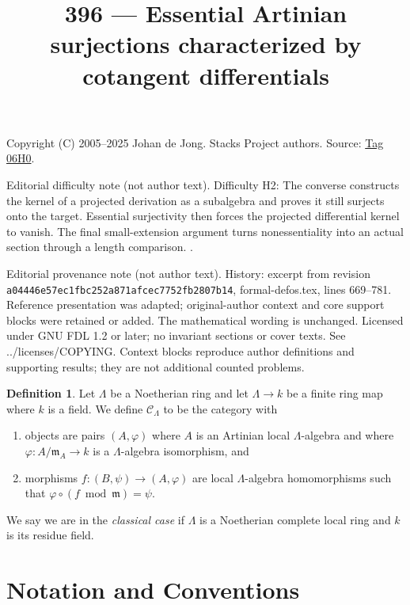 \documentclass{amsart}
\theoremstyle{plain}
\theoremstyle{definition}
\newtheorem{definition}[subsection]{Definition}
\theoremstyle{remark}
\numberwithin{equation}{subsection}
\begin{document}
\title[Stacks Project, Tag 06H0]{396 --- Essential Artinian surjections characterized by cotangent differentials}
\maketitle
\noindent Copyright (C) 2005--2025 Johan de Jong. Stacks Project authors. Source: \href{https://stacks.math.columbia.edu/tag/06H0}{Tag 06H0}.

\noindent Editorial difficulty note (not author text). Difficulty H2: The converse constructs the kernel of a projected derivation as a subalgebra and proves it still surjects onto the target. Essential surjectivity then forces the projected differential kernel to vanish. The final small-extension argument turns nonessentiality into an actual section through a length comparison. .

\noindent Editorial provenance note (not author text). History: excerpt from revision \texttt{a0444\allowbreak 6e57e\allowbreak c1fbc\allowbreak 252a8\allowbreak 71afc\allowbreak ec775\allowbreak 2fb28\allowbreak 07b14}, formal-defos.tex, lines 669--781. Reference presentation was adapted; original-author context and core support blocks were retained or added. The mathematical wording is unchanged. Licensed under GNU FDL 1.2 or later; no invariant sections or cover texts. See ../licenses/COPYING. Context blocks reproduce author definitions and supporting results; they are not additional counted problems.

\begin{definition}
\label{definition-CLambda}
Let $\Lambda$ be a Noetherian ring and let $\Lambda \to k$ be a finite
ring map where $k$ is a field. We define {\it $\mathcal{C}_\Lambda$} to be
the category with
\begin{enumerate}
\item objects are pairs $(A, \varphi)$ where $A$ is an Artinian local
$\Lambda$-algebra and where $\varphi : A/\mathfrak m_A \to k$ is a
$\Lambda$-algebra isomorphism, and
\item morphisms $f : (B, \psi) \to (A, \varphi)$ are local $\Lambda$-algebra
homomorphisms such that $\varphi \circ (f \bmod \mathfrak m) = \psi$.
\end{enumerate}
We say we are in the {\it classical case} if $\Lambda$ is a Noetherian
complete local ring and $k$ is its residue field.
\end{definition}

\section{Notation and Conventions}
\label{section-notations-conventions}
\end{document}
